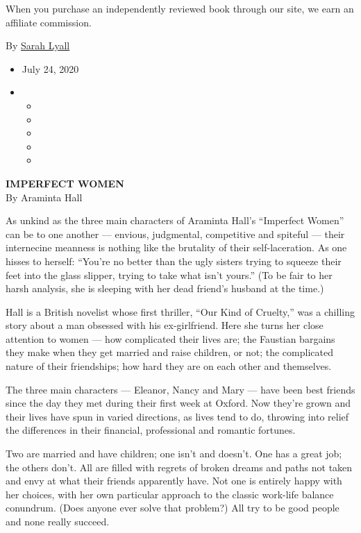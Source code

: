 When you purchase an independently reviewed book through our site, we
earn an affiliate commission.

By \href{https://www.nytimes3xbfgragh.onion/by/sarah-lyall}{Sarah Lyall}

\begin{itemize}
\item
  July 24, 2020
\item
  \begin{itemize}
  \item
  \item
  \item
  \item
  \item
  \end{itemize}
\end{itemize}

\textbf{IMPERFECT WOMEN}\\
By Araminta Hall

As unkind as the three main characters of Araminta Hall's ``Imperfect
Women'' can be to one another --- envious, judgmental, competitive and
spiteful --- their internecine meanness is nothing like the brutality of
their self-laceration. As one hisses to herself: ``You're no better than
the ugly sisters trying to squeeze their feet into the glass slipper,
trying to take what isn't yours.'' (To be fair to her harsh analysis,
she is sleeping with her dead friend's husband at the time.)

Hall is a British novelist whose first thriller, ``Our Kind of
Cruelty,'' was a chilling story about a man obsessed with his
ex-girlfriend. Here she turns her close attention to women --- how
complicated their lives are; the Faustian bargains they make when they
get married and raise children, or not; the complicated nature of their
friendships; how hard they are on each other and themselves.

The three main characters --- Eleanor, Nancy and Mary --- have been best
friends since the day they met during their first week at Oxford. Now
they're grown and their lives have spun in varied directions, as lives
tend to do, throwing into relief the differences in their financial,
professional and romantic fortunes.

Two are married and have children; one isn't and doesn't. One has a
great job; the others don't. All are filled with regrets of broken
dreams and paths not taken and envy at what their friends apparently
have. Not one is entirely happy with her choices, with her own
particular approach to the classic work-life balance conundrum. (Does
anyone ever solve that problem?) All try to be good people and none
really succeed.

